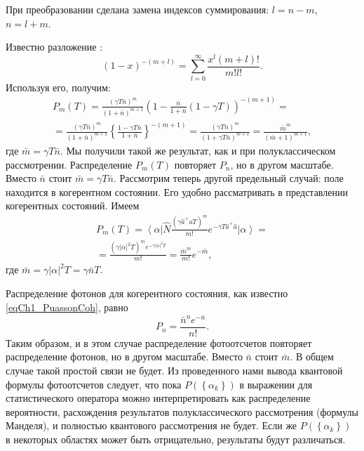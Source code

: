 При преобразовании сделана замена индексов суммирования: $l = n - m$,
$n = l + m$.

Известно разложение \cite{bDvait1973}:
\[
\left(1 - x\right)^{-\left(m + l\right)} = 
\sum_{l = 0}^\infty
\frac{x^l \left(m + l\right)!}{m! l!}.
\]
Используя его, получим:
\begin{eqnarray}
P_m\left(T\right) = 
\frac{\left(\gamma T \bar{n}\right)^m}{\left(1 + \bar{n}\right)^{m +
    1}}
\left(
1 - \frac{\bar{n}}{1 + \bar{n}}\left(1 - \gamma T\right)
\right)^{-\left(m + 1\right)} = 
\nonumber \\
=
\frac{\left(\gamma T \bar{n}\right)^m}{\left(1 + \bar{n}\right)^{m +
    1}} 
\left\{
\frac{1 - \gamma T \bar{n}}{1 + \bar{n}} 
\right\}^{-\left(m + 1\right)} = 
\frac{\left(\gamma T \bar{n}\right)^m}{\left(1 + \gamma T \bar{n}\right)^{m +
    1}} =
\frac{\bar{m}^m}{\left(\bar{m} + 1\right)^{m + 1}},
\label{eqCh4_66}
\end{eqnarray}
где $\bar{m} = \gamma T \bar{n}$.  Мы получили такой же результат, как
и при полуклассическом 
рассмотрении. Распределение $P_m\left(T\right)$ повторяет $P_n$,  но в
другом 
масштабе. Вместо $\bar{n}$ стоит $\bar{m} = \gamma T
\bar{n}$. Рассмотрим теперь другой предельный случай: поле находится в
когерентном состоянии. Его удобно рассматривать в представлении
когерентных состояний. Имеем  
\begin{eqnarray}
P_m\left(T\right) = 
\left<\alpha\right|
\hat{N}
\frac{\left(\gamma \hat{a}^{+} \hat{a} T\right)^m}{m!}
e^{- \gamma T \hat{a}^{+} \hat{a}}
\left|\alpha\right> = 
\nonumber \\
=
\frac{\left(\gamma \left|\alpha\right|^2 T\right)^m e^{-\gamma
    \left|\alpha\right|^2 T}}{m!} = 
\frac{\bar{m}^m}{m!}e^{-\bar{m}},
\label{eqCh4_67}
\end{eqnarray}
где $\bar{m} = \gamma \left|\alpha\right|^2 T = \gamma \bar{n} T$.

Распределение фотонов для когерентного состояния, как известно
\eqref{eqCh1_PuassonCoh}, 
равно  
\[
P_n = \frac{\bar{n}^n e^{-\bar{n}}}{n!}.
\]
Таким образом, и в этом случае распределение фотоотсчетов
повторяет распределение фотонов, но в другом масштабе. Вместо
$\bar{n}$ стоит $\bar{m}$.  В общем случае  такой простой связи не
будет. Из проведенного нами вывода квантовой формулы фотоотсчетов
следует, что пока $P\left(\left\{\alpha_k\right\}\right)$ в выражении 
для статистического оператора можно интерпретировать как распределение
вероятности, расхождения результатов полуклассического рассмотрения
(формулы Манделя), и полностью квантового рассмотрения не будет. Если
же $P\left(\left\{\alpha_k\right\}\right)$ в некоторых областях может
быть отрицательно, результаты будут различаться.  
